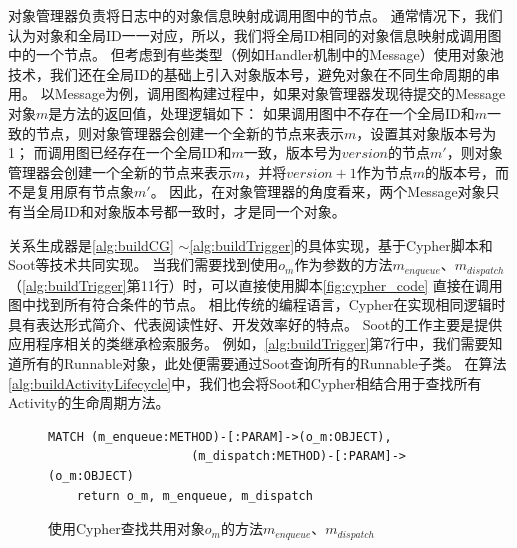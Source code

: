 

对象管理器负责将日志中的对象信息映射成调用图中的节点。
通常情况下，我们认为对象和全局ID一一对应，所以，我们将全局ID相同的对象信息映射成调用图中的一个节点。
但考虑到有些类型（例如Handler机制中的Message）使用对象池技术，我们还在全局ID的基础上引入对象版本号，避免对象在不同生命周期的串用。
以Message为例，调用图构建过程中，如果对象管理器发现待提交的Message对象$m$是方法的返回值，处理逻辑如下：
如果调用图中不存在一个全局ID和$m$一致的节点，则对象管理器会创建一个全新的节点来表示$m$，设置其对象版本号为1；
而调用图已经存在一个全局ID和$m$一致，版本号为$version$的节点$m'$，则对象管理器会创建一个全新的节点来表示$m$，并将$version + 1$作为节点$m$的版本号，而不是复用原有节点象$m'$。
因此，在对象管理器的角度看来，两个Message对象只有当全局ID和对象版本号都一致时，才是同一个对象。



关系生成器是\autoref{alg:buildCG} $\sim$\autoref{alg:buildTrigger}的具体实现，基于Cypher脚本和Soot等技术共同实现。
当我们需要找到使用$o_{m}$作为参数的方法$m_{enqueue}$、$m_{dispatch}$（\autoref{alg:buildTrigger}第11行）时，可以直接使用脚本\autoref{fig:cypher_code}
直接在调用图中找到所有符合条件的节点。
相比传统的编程语言，Cypher在实现相同逻辑时具有表达形式简介、代表阅读性好、开发效率好的特点。
Soot的工作主要是提供应用程序相关的类继承检索服务。
例如，\autoref{alg:buildTrigger}第7行中，我们需要知道所有的Runnable对象，此处便需要通过Soot查询所有的Runnable子类。
在算法\ref{alg:buildActivityLifecycle}中，我们也会将Soot和Cypher相结合用于查找所有Activity的生命周期方法。


\begin{figure}[!h]
	\centering
	\begin{lstlisting}[style=normal,language=cypher]
	MATCH (m_enqueue:METHOD)-[:PARAM]->(o_m:OBJECT),
					(m_dispatch:METHOD)-[:PARAM]->(o_m:OBJECT)
	return o_m, m_enqueue, m_dispatch\end{lstlisting}
	\caption{使用Cypher查找共用对象$o_m$的方法$m_{enqueue}$、$m_{dispatch}$}
	\label{fig:cypher_code}
\end{figure}


